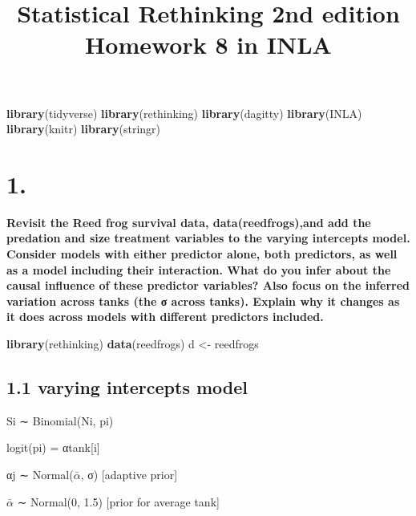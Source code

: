 \documentclass[
]{article}
\title{Statistical Rethinking 2nd edition Homework 8 in INLA}
\author{}
\date{\vspace{-2.5em}}
\newenvironment{Shaded}{\begin{snugshade}}{\end{snugshade}}
\newcommand{\KeywordTok}[1]{\textcolor[rgb]{0.13,0.29,0.53}{\textbf{#1}}}
\newcommand{\NormalTok}[1]{#1}
\newcommand{\StringTok}[1]{\textcolor[rgb]{0.31,0.60,0.02}{#1}}
\begin{document}
\maketitle

{
\setcounter{tocdepth}{2}
\tableofcontents
}
\begin{Shaded}
\begin{Highlighting}[]
\KeywordTok{library}\NormalTok{(tidyverse)}
\KeywordTok{library}\NormalTok{(rethinking)}
\KeywordTok{library}\NormalTok{(dagitty)}
\KeywordTok{library}\NormalTok{(INLA)}
\KeywordTok{library}\NormalTok{(knitr)}
\KeywordTok{library}\NormalTok{(stringr)}
\end{Highlighting}
\end{Shaded}

\hypertarget{section}{%
\section{1.}\label{section}}

\textbf{Revisit the Reed frog survival data, data(reedfrogs),and add the
predation and size treatment variables to the varying intercepts model.
Consider models with either predictor alone, both predictors, as well as
a model including their interaction. What do you infer about the causal
influence of these predictor variables? Also focus on the inferred
variation across tanks (the σ across tanks). Explain why it changes as
it does across models with different predictors included.}

\begin{Shaded}
\begin{Highlighting}[]
\KeywordTok{library}\NormalTok{(rethinking) }
\KeywordTok{data}\NormalTok{(reedfrogs)}
\NormalTok{d <-}\StringTok{ }\NormalTok{reedfrogs}
\end{Highlighting}
\end{Shaded}

\hypertarget{varying-intercepts-model}{%
\subsection{1.1 varying intercepts
model}\label{varying-intercepts-model}}

Si ∼ Binomial(Ni, pi)

logit(pi) = αtank{[}i{]}

αj ∼ Normal(\(\bar{\alpha}\), σ) {[}adaptive prior{]}

\(\bar{\alpha}\) ∼ Normal(0, 1.5) {[}prior for average tank{]}
\end{document}
